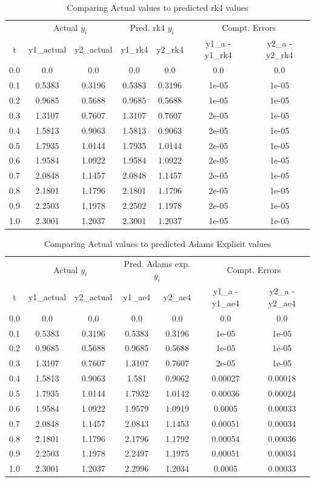 \documentclass[12pt,oneside]{book}
\begin{document}
		\begin{table}[h!]
			\caption{Comparing Actual values to predicted \ac{rk4} values}
			\begin{tabular}{ccccccc}
				\toprule
				& \multicolumn{2}{c}{Actual $ y_{i} $} & \multicolumn{2}{c}{Pred. \ac{rk4} $ y_{i} $ } & \multicolumn{2}{c}{Compt. Errors} \\
				t&y1\_actual&y2\_actual&y1\_rk4&y2\_rk4&y1\_a - y1\_rk4&y2\_a - y2\_rk4 \\ \midrule
				0.0&0.0&0.0&0.0&0.0&0.0&0.0\\
				0.1&0.5383&0.3196&0.5383&0.3196&1e-05&1e-05\\
				0.2&0.9685&0.5688&0.9685&0.5688&1e-05&1e-05\\
				0.3&1.3107&0.7607&1.3107&0.7607&2e-05&1e-05\\
				0.4&1.5813&0.9063&1.5813&0.9063&2e-05&1e-05\\
				0.5&1.7935&1.0144&1.7935&1.0144&2e-05&1e-05\\
				0.6&1.9584&1.0922&1.9584&1.0922&2e-05&1e-05\\
				0.7&2.0848&1.1457&2.0848&1.1457&2e-05&1e-05\\
				0.8&2.1801&1.1796&2.1801&1.1796&2e-05&1e-05\\
				0.9&2.2503&1.1978&2.2502&1.1978&2e-05&1e-05\\
				1.0&2.3001&1.2037&2.3001&1.2037&1e-05&1e-05\\
				\bottomrule
			\end{tabular}
		\end{table}
	
		\begin{table}[h!]
			\caption{Comparing Actual values to predicted Adams Explicit values}
			\begin{tabular}{ccccccc}
				\toprule
				& \multicolumn{2}{c}{Actual $ y_{i} $} & \multicolumn{2}{c}{Pred. Adams exp. $ y_{i} $ } & \multicolumn{2}{c}{Compt. Errors} \\
				t&y1\_actual&y2\_actual&y1\_ae4&y2\_ae4&y1\_a - y1\_ae4&y2\_a - y2\_ae4 \\ \midrule
				0.0&0.0&0.0&0.0&0.0&0.0&0.0\\
				0.1&0.5383&0.3196&0.5383&0.3196&1e-05&1e-05 \\
				0.2&0.9685&0.5688&0.9685&0.5688&1e-05&1e-05 \\
				0.3&1.3107&0.7607&1.3107&0.7607&2e-05&1e-05 \\
				0.4&1.5813&0.9063&1.581&0.9062&0.00027&0.00018 \\
				0.5&1.7935&1.0144&1.7932&1.0142&0.00036&0.00024\\
				0.6&1.9584&1.0922&1.9579&1.0919&0.0005&0.00033\\
				0.7&2.0848&1.1457&2.0843&1.1453&0.00051&0.00034\\
				0.8&2.1801&1.1796&2.1796&1.1792&0.00054&0.00036\\
				0.9&2.2503&1.1978&2.2497&1.1975&0.00051&0.00034\\
				1.0&2.3001&1.2037&2.2996&1.2034&0.0005&0.00033\\
				\bottomrule
			\end{tabular}
		\end{table}
	
\end{document}
